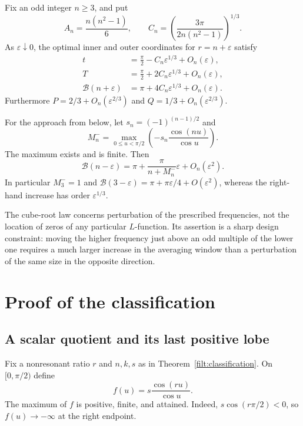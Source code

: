 \begin{theorem}\label{filt:cusp}
Fix an odd integer $n\ge3$, and put
\[
 A_n=\frac{n(n^2-1)}6,
 \qquad
 C_n=\left(\frac{3\pi}{2n(n^2-1)}\right)^{1/3}.
\]
As $\varepsilon\downarrow0$, the optimal inner and outer coordinates for
$r=n+\varepsilon$ satisfy
\begin{align}
 t&=\frac\pi2-C_n\varepsilon^{1/3}+O_n(\varepsilon),\label{filt:innercusp}\\
 T&=\frac\pi2+2C_n\varepsilon^{1/3}+O_n(\varepsilon),\label{filt:outercusp}\\
 \mathcal B(n+\varepsilon)
   &=\pi+4C_n\varepsilon^{1/3}+O_n(\varepsilon).\label{filt:widthcusp}
\end{align}
Furthermore $P=2/3+O_n(\varepsilon^{2/3})$ and
$Q=1/3+O_n(\varepsilon^{2/3})$.

For the approach from below, let $s_n=(-1)^{(n-1)/2}$ and
\[
 M_n^- =\max_{0\le u<\pi/2}
                 \left(-s_n\frac{\cos(nu)}{\cos u}\right).
\]
The maximum exists and is finite.  Then
\begin{equation}\label{filt:left}
 \mathcal B(n-\varepsilon)
 =\pi+\frac{\pi}{n+M_n^-}\varepsilon+O_n(\varepsilon^2).
\end{equation}
In particular $M_3^-=1$ and
$\mathcal B(3-\varepsilon)=\pi+\pi\varepsilon/4+O(\varepsilon^2)$,
whereas the right-hand increase has order $\varepsilon^{1/3}$.
\end{theorem}

The cube-root law concerns perturbation of the prescribed frequencies, not
the location of zeros of any particular $L$-function.  Its assertion is a
sharp design constraint: moving the higher frequency just above an odd
multiple of the lower one requires a much larger increase in the averaging
window than a perturbation of the same size in the opposite direction.

\section{Proof of the classification}

\subsection{A scalar quotient and its last positive lobe}

Fix a nonresonant ratio $r$ and $n,k,s$ as in
Theorem~\ref{filt:classification}.  On $[0,\pi/2)$ define
\[
 f(u)=s\frac{\cos(ru)}{\cos u}.
\]
The maximum of $f$ is positive, finite, and attained.  Indeed,
$s\cos(r\pi/2)<0$, so $f(u)\to-\infty$ at the right endpoint.


